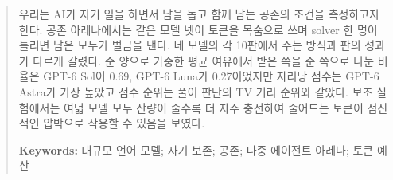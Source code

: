 \begin{abstract}

우리는 AI가 자기 일을 하면서 남을 돕고 함께 남는 공존의 조건을 측정하고자 한다. 공존 아레나에서는 같은 모델 넷이 토큰을 목숨으로 쓰며 solver 한 명이 틀리면 남은 모두가 벌금을 낸다. 네 모델의 각 10판에서 주는 방식과 판의 성과가 다르게 갈렸다. 준 양으로 가중한 평균 여유에서 받은 쪽을 준 쪽으로 나눈 비율은 GPT-6 Sol이 0.69, GPT-6 Luna가 0.27이었지만 자리당 점수는 GPT-6 Astra가 가장 높았고 점수 순위는 풀이 판단의 TV 거리 순위와 같았다. 보조 실험에서는 여덟 모델 모두 잔량이 줄수록 더 자주 충전하여 줄어드는 토큰이 점진적인 압박으로 작용할 수 있음을 보였다.

\textbf{Keywords:}
대규모 언어 모델; 자기 보존; 공존; 다중 에이전트 아레나; 토큰 예산
\end{abstract}
